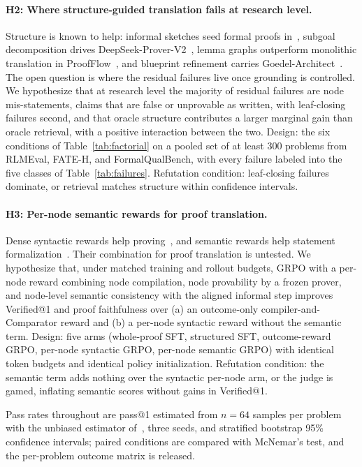 \documentclass[sigconf,anonymous]{aamas}
\begin{document}
{\paragraph{H2: Where structure-guided translation fails at research level.}
Structure is known to help: informal sketches seed formal proofs
in~\citet{dsp2023}, subgoal decomposition drives
DeepSeek-Prover-V2~\citep{deepseekproverv2}, lemma graphs outperform monolithic
translation in ProofFlow~\citep{proofflow2025}, and blueprint refinement carries
Goedel-Architect~\citep{goedelarchitect2026}. The open question is where the
residual failures live once grounding is controlled. We hypothesize that at
research level the majority of residual failures are node mis-statements, claims
that are false or unprovable as written, with leaf-closing failures second, and
that oracle structure contributes a larger marginal gain than oracle retrieval,
with a positive interaction between the two. Design: the six conditions of
Table~\ref{tab:factorial} on a pooled set of at least 300 problems from RLMEval,
FATE-H, and FormalQualBench, with every failure labeled into the five classes of
Table~\ref{tab:failures}. Refutation condition: leaf-closing failures dominate,
or retrieval matches structure within confidence intervals.

\paragraph{H3: Per-node semantic rewards for proof translation.} Dense syntactic
rewards help proving~\citep{processrl2026}, and semantic rewards help statement
formalization~\citep{formarl2025, mathesis2025, criticlean2025}. Their
combination for proof translation is untested. We hypothesize that, under
matched training and rollout budgets, GRPO with a per-node reward combining node
compilation, node provability by a frozen prover, and node-level semantic
consistency with the aligned informal step improves Verified@1 and proof
faithfulness over (a) an outcome-only compiler-and-Comparator reward and (b) a
per-node syntactic reward without the semantic term. Design: five arms
(whole-proof SFT, structured SFT, outcome-reward GRPO, per-node syntactic GRPO,
per-node semantic GRPO) with identical token budgets and identical policy
initialization. Refutation condition: the semantic term adds nothing over the
syntactic per-node arm, or the judge is gamed, inflating semantic scores without
gains in Verified@1.

Pass rates throughout are pass@1 estimated from $n{=}64$ samples per problem
with the unbiased estimator of~\citet{chen2021codex}, three seeds, and
stratified bootstrap 95\% confidence intervals; paired conditions are compared
with McNemar's test, and the per-problem outcome matrix is released.

}
\end{document}
